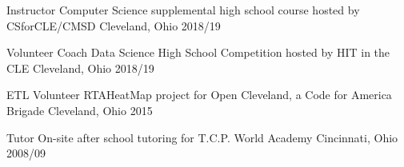 

\begin{cvhonors}

  \cvhonor
    {Instructor} %
    {Computer Science supplemental high school course hosted by CSforCLE/CMSD} %
    {Cleveland, Ohio} %
    {2018/19} %

  \cvhonor
    {Volunteer Coach} %
    {Data Science High School Competition hosted by HIT in the CLE} %
    {Cleveland, Ohio} %
    {2018/19} %

  \cvhonor
    {ETL Volunteer} %
    {RTAHeatMap project for Open Cleveland, a Code for America Brigade} %
    {Cleveland, Ohio} %
    {2015} %

  \cvhonor
    {Tutor} %
    {On-site after school tutoring for T.C.P. World Academy} %
    {Cincinnati, Ohio} %
    {2008/09} %

\end{cvhonors}
